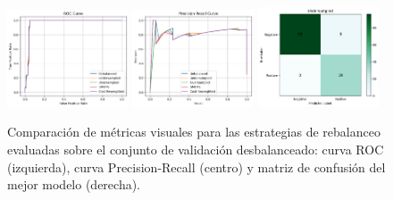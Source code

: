 \documentclass[11pt]{article}
\begin{document}
\begin{table}[H]
    \centering
    \caption{Métricas de desempeño final sobre el conjunto de test para distintos métodos de rebalanceo, utilizando los hiperparámetros previamente seleccionados.}
    \label{tab:rebalanceo_test_metrics}
\end{table}

\begin{figure}[H]
    \centering
    \includegraphics[width=0.32\textwidth]{figures/rebalanceo_roc.png}
    \hfill
    \includegraphics[width=0.32\textwidth]{figures/rebalanceo_pr.png}
    \hfill
    \includegraphics[width=0.32\textwidth]{figures/rebalanceo_conf_matrix.png}
    \caption{Comparación de métricas visuales para las estrategias de rebalanceo evaluadas sobre el conjunto de validación desbalanceado: curva ROC (izquierda), curva Precision-Recall (centro) y matriz de confusión del mejor modelo (derecha).}
    \label{fig:rebalanceo_curves}
\end{figure}
\end{document}
